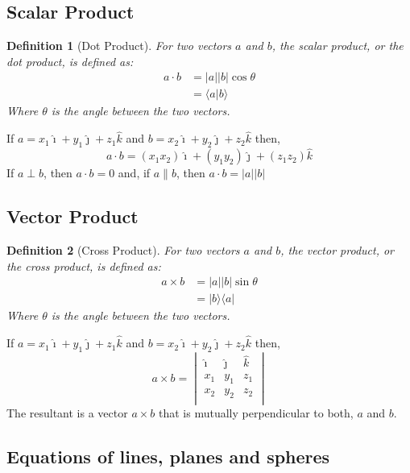 \documentclass[12pt]{article}
\newtheorem{defn}{Definition}
\begin{document}
\subsection{Scalar Product}
\begin{defn}[Dot Product]
For two vectors $a$ and $b$, the scalar product, or the dot product, is defined as:
\begin{align*}
a \cdot b &= \lvert a \rvert \lvert b \rvert \cos\theta \\
&= \langle a |b \rangle
\end{align*}
Where $\theta$ is the angle between the two vectors.
\end{defn}
If $a = x_1 \hat{\imath} + y_1 \hat{\jmath} + z_1 \hat{k}$ and $b = x_2 \hat{\imath} + y_2 \hat{\jmath} + z_2 \hat{k}$ then, 	 
$$a \cdot b = (x_1 x_2)\hat{\imath} + (y_1 y_2)\hat{\jmath} + (z_1 z_2)\hat{k}$$
If $a \perp b$, then $a\cdot b = 0$ and, if $a \parallel b$, then $a\cdot b = |a||b|$ 

\subsection{Vector Product}
\begin{defn}[Cross Product]
For two vectors $a$ and $b$, the vector product, or the cross product, is defined as:
\begin{align*}
a\times b &= \lvert a \rvert \lvert b \rvert \sin\theta \\
&=|b\rangle \langle a|
\end{align*}
Where $\theta$ is the angle between the two vectors.
\end{defn}
If $a = x_1 \hat{\imath} + y_1 \hat{\jmath} + z_1 \hat{k}$ and $b = x_2 \hat{\imath} + y_2 \hat{\jmath} + z_2 \hat{k}$ then,
$$
a \times b =  
\begin{vmatrix}
\hat{\imath} & \hat{\jmath} & \hat{k} \\
x_1 & y_1 & z_1 \\
x_2 & y_2 & z_2 \\
\end{vmatrix}
$$
The resultant is a vector $a\times{b}$ that is mutually perpendicular to both, $a$ and $b$.
\subsection{Equations of lines, planes and spheres}
\end{document}
